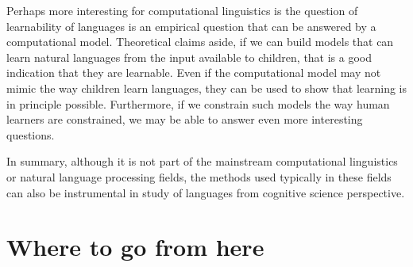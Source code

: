 \begin{marginfigure}
  \begin{center}
    \tikzset{external/export next=false}%
  \end{center}
  \caption{\label{fig:chomsky-h-cross}%
    A possible set (indicated by the shaded region in the figure)
    for class of natural languages in the Chomsky hierarchy,
    to demonstrate that learnability results on a particular language
    class in the hierarchy is not necessarily
    a positive or negative indication for learnability of natural languages. 
    As in Figure~\ref{fig:chomsky-h-mcs},
    the dashed ellipse represents
    the class of mildly context-sensitive languages.
  }
\end{marginfigure}

Perhaps more interesting for computational linguistics is
the question of learnability of languages is an empirical question
that can be answered by a computational model.
Theoretical claims aside,
if we can build models that can learn natural languages
from the input available to children,
that is a good indication that they are learnable.
Even if the computational model may not mimic
the way children learn languages,
they can be used to show that learning is in principle possible.
Furthermore,
if we constrain such models the way human learners are constrained,
we may be able to answer even more interesting questions.

In summary,
although it is not part of the mainstream
computational linguistics or natural language processing fields,
the methods used typically in these fields can also be instrumental
in study of languages from cognitive science perspective.

\section{Where to go from here}


